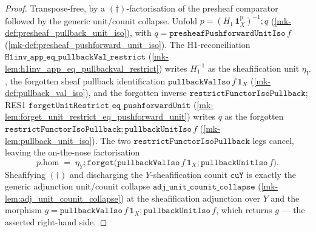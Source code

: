 \begin{proof}
  \leanok
  Transpose-free, by a \((\dagger)\)-factorisation of the presheaf comparator followed by the generic
  unit/counit collapse. Unfold \(p = (H_1\,\mathbf 1^{\mathrm p}_X)^{-1} \mathbin{;} q\)
  (\ref{mk-def:presheaf_pullback_unit_iso}), with \(q = \mathtt{presheafPushforwardUnitIso}\,f\)
  (\ref{mk-def:presheaf_pushforward_unit_iso}). The H1-reconciliation
  \(\mathtt{H1inv\_app\_eq\_pullbackVal\_restrict}\)
  (\ref{mk-lem:h1inv_app_eq_pullbackval_restrict}) writes \(H_1^{-1}\) as the sheafification unit
  \(\eta_Y\), the forgotten sheaf pullback identification \(\mathtt{pullbackValIso}\,f\,\mathbf 1_X\)
  (\ref{mk-def:pullback_val_iso}), and the forgotten inverse \(\mathtt{restrictFunctorIsoPullback}\);
  RES1 \(\mathtt{forgetUnitRestrict\_eq\_pushforwardUnit}\)
  (\ref{mk-lem:forget_unit_restrict_eq_pushforward_unit}) writes \(q\) as the forgotten
  \(\mathtt{restrictFunctorIsoPullback} \mathbin{;} \mathtt{pullbackUnitIso}\,f\)
  (\ref{mk-lem:pullback_unit_iso}). The two \(\mathtt{restrictFunctorIsoPullback}\) legs cancel, leaving
  the on-the-nose factorisation
  \[
    p.\mathrm{hom} \;=\; \eta_Y \mathbin{;}
      \mathtt{forget}\bigl(\mathtt{pullbackValIso}\,f\,\mathbf 1_X
        \mathbin{;} \mathtt{pullbackUnitIso}\,f\bigr).
    \tag{$\dagger$}
  \]
  Sheafifying \((\dagger)\) and discharging the \(Y\)-sheafification counit \(\mathtt{cuY}\) is exactly
  the generic adjunction unit/counit collapse \(\mathtt{adj\_unit\_counit\_collapse}\)
  (\ref{mk-lem:adj_unit_counit_collapse}) at the sheafification adjunction over \(Y\) and the morphism
  \(g = \mathtt{pullbackValIso}\,f\,\mathbf 1_X \mathbin{;} \mathtt{pullbackUnitIso}\,f\), which returns
  \(g\) --- the asserted right-hand side.
\end{proof}

